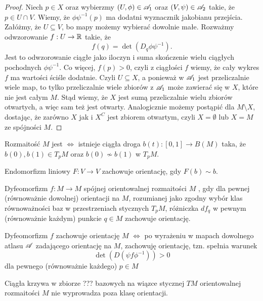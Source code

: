 \begin{proof}
  Niech $p\in X$ oraz wybierzmy $(U,\phi)\in\mathcal{A}_1$ oraz $(V,\psi)\in\mathcal{A}_2$ takie, że $p\in U\cap V$. Wiemy, że $\phi\psi^{-1}(p)$ ma dodatni wyznacznik jakobianu przejścia. Załóżmy, że $U\subseteq V$, bo mapy możemy wybierać dowolnie małe. Rozważmy odwzorowanie $f:U\to\mathbb{R}$ takie, że 
  $$f(q)=\det(D_q\phi\psi^{-1}).$$ 
  Jest to odwzorowanie ciągłe jako iloczyn i suma skończenie wielu ciągłych pochodnych $\phi\psi^{-1}$. Co więcej, $f(p)>0$, czyli z ciągłości $f$ wiemy, że cały wykres $f$ ma wartości ściśle dodatnie. Czyli $U\subseteq X$, a ponieważ w $\mathcal{A}_1$ jest przeliczalnie wiele map, to tylko przeliczalnie wiele zbiorów z $\mathcal{A}_1$ może zawierać się w $X$, które nie jest całym $M$. Stąd wiemy, że $X$ jest sumą przeliczalnie wielu zbiorów otwartych, a więc sam też jest otwarty. Analogicznie możemy postąpić dla $M\setminus X$, dostając, że zarówno $X$ jak i $X^C$ jest zbiorem otwartym, czyli $X=\emptyset$ lub $X=M$ ze spójności $M$.
\end{proof}

\begin{fact}
  Rozmaitość $M$ jest  $\iff$ istnieje ciągła droga $b(t):[0,1]\to B(M)$ taka, że $b(0),b(1)\in T_pM$ oraz $b(0)\not\sim b(1)$ w $T_pM$.
\end{fact}


Endomorfizm liniowy $F:V\to V$ zachowuje orientację, gdy $F(b)\sim b$.

\begin{definition}
  Dyfeomorfizm $f:M\to M$ spójnej orientowalnej rozmaitości $M$ , gdy dla pewnej (równoważnie dowolnej) orientacji na $M$, rozumianej jako zgodny wybór klas równoważności baz w przestrzeniach stycznych $T_pM$, różniczka $df_q$ w pewnym (równoważnie każdym)  punkcie $q\in M$ zachowuje orientację.
\end{definition}

\begin{remark} Dyfeomorfizm $f$ zachowuje orientację $M$ $\iff$ po wyrażeniu w mapach dowolnego atlasu $\mathcal{A}$ zadającego orientację na $M$, zachowuję orientację, tzn. spełnia warunek
  $$\det(D(\psi f\phi^{-1}))>0$$
  dla pewnego (równoważnie każdego) $p\in M$
\end{remark}

\begin{remark}
  Ciągła krzywa w zbiorze ??? bazowych na wiązce stycznej $TM$ orientowalnej rozmaitości $M$ nie wyprowadza poza klasę orientacji.
\end{remark}

